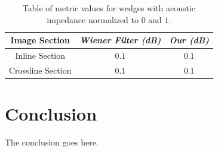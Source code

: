 \documentclass[journal]{IEEEtran}
\begin{document}
\begin{table}[!t]
\renewcommand{\arraystretch}{1.3}
\caption{Table of metric values for wedges with acoustic impedance normalized to $0$ and $1$.}
\label{table_caso_1}
\centering
\begin{tabular}{|c||c||c|}
\hline
 \textbf{Image Section} & \textbf{\textit{Wiener Filter (dB)}} & \textbf{\textit{Our (dB)}}\\
\hline
Inline Section & $0.1$ & $0.1$ \\
\hline
Crossline Section & $0.1$ & $0.1$ \\
\hline
\end{tabular}
\end{table}

\section{Conclusion} \label{Conclusion}
The conclusion goes here.


%

% 
\end{document}
